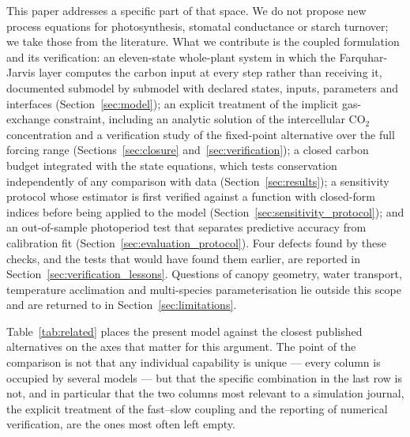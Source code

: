 \documentclass[a4paper,fleqn]{cas-sc}
\begin{document}
This paper addresses a specific part of that space. We do not propose new process equations for photosynthesis, stomatal conductance or starch turnover; we take those from the literature. What we contribute is the coupled formulation and its verification: an eleven-state whole-plant system in which the Farquhar-Jarvis layer computes the carbon input at every step rather than receiving it, documented submodel by submodel with declared states, inputs, parameters and interfaces (Section~\ref{sec:model}); an explicit treatment of the implicit gas-exchange constraint, including an analytic solution of the intercellular CO$_2$ concentration and a verification study of the fixed-point alternative over the full forcing range (Sections~\ref{sec:closure} and~\ref{sec:verification}); a closed carbon budget integrated with the state equations, which tests conservation independently of any comparison with data (Section~\ref{sec:results}); a sensitivity protocol whose estimator is first verified against a function with closed-form indices before being applied to the model (Section~\ref{sec:sensitivity_protocol}); and an out-of-sample photoperiod test that separates predictive accuracy from calibration fit (Section~\ref{sec:evaluation_protocol}). Four defects found by these checks, and the tests that would have found them earlier, are reported in Section~\ref{sec:verification_lessons}. Questions of canopy geometry, water transport, temperature acclimation and multi-species parameterisation lie outside this scope and are returned to in Section~\ref{sec:limitations}.

Table~\ref{tab:related} places the present model against the closest published
alternatives on the axes that matter for this argument. The point of the
comparison is not that any individual capability is unique --- every column is
occupied by several models --- but that the specific combination in the last
row is not, and in particular that the two columns most relevant to a
simulation journal, the explicit treatment of the fast--slow coupling and the
reporting of numerical verification, are the ones most often left empty.
\end{document}
